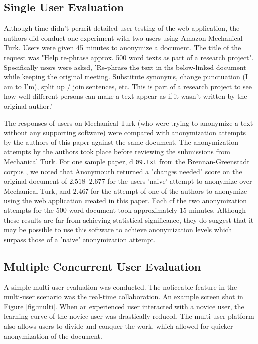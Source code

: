 \documentclass[letterpaper]{article}
\begin{document}
\subsection{Single User Evaluation}

Although time didn't permit detailed user testing of the web
application, the authors did conduct one experiment with two users
using Amazon Mechanical Turk. Users were given 45 minutes to anonymize
a document. The title of the request was "Help re-phrase approx. 500
word texts as part of a research project". Specifically users were
asked, 'Re-phrase the text in the below-linked document while keeping
the original meeting. Substitute synonyms, change punctuation (I am to
I'm), split up / join sentences, etc. This is part of a research
project to see how well different persons can make a text appear as if
it wasn't written by the original author.'

The responses of users on Mechanical Turk (who were trying to
anonymize a text without any supporting software) were compared with
anonymization attempts by the authors of this paper against the same
document. The anonymization attempts by the authors took place before
reviewing the submissions from Mechanical Turk. For one sample paper,
d \texttt{09.txt} from the Brennan-Greenstadt corpus \cite{BrennanG09}
, we noted that Anonymouth returned a "changes needed"
score on the original document of $2.518$, $2.677$ for the users 'naive'
attempt to anonymize over Mechanical Turk, and $2.467$ for the attempt
of one of the authors to anonymize using the web application created
in this paper. Each of the two anonymization attempts for the 500-word
document took approximately 15 minutes. Although these results are far
from achieving statistical significance, they do suggest that it may
be possible to use this software to achieve anonymization levels which
surpass those of a 'naive' anonymization attempt.

\subsection{Multiple Concurrent User Evaluation}

A simple multi-user evaluation was conducted.  The noticeable feature
in the multi-user scenario was the real-time collaboration.  An example
screen shot in Figure \ref{fig:multi}.  When an experienced user
interacted with a novice user, the learning curve of the novice user
was drastically reduced.  The multi-user platform also allows users to
divide and conquer the work, which allowed for quicker anonymization
of the document.
\end{document}
